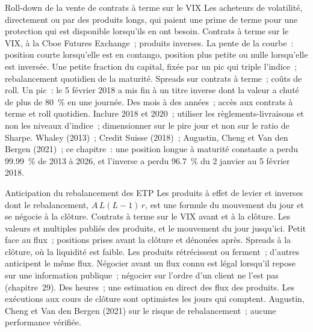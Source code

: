 \begin{strategyfile}{Roll-down de la vente de contrats à terme sur le VIX}\label{strat:s2:the-volatility-index-complex:rolldown}
 Les acheteurs de volatilité, directement ou par des produits longs, qui paient une prime de terme pour une protection qui est
disponible lorsqu'ils en ont besoin.
 Contrats à terme sur le VIX, à la Cboe Futures Exchange~; produits inverses.
 La pente de la courbe~: position courte lorsqu'elle est en contango, position plus petite ou nulle lorsqu'elle est inversée.
 Une petite fraction du capital, fixée par un pic qui triple l'indice~; rebalancement quotidien de la maturité.
 Spreads sur contrats à terme~; coûts de roll.
 Un pic~: le 5 février 2018 a mis fin à un titre inverse dont la valeur a chuté de plus de 80~\% en une journée.
 Des mois à des années~; accès aux contrats à terme et roll quotidien.
 Inclure 2018 et 2020~; utiliser les règlements-livraisons et non les niveaux d'indice~; dimensionner sur le pire jour et non sur le ratio de Sharpe.
 Whaley (2013)~; Credit Suisse (2018)~; Augustin, Cheng et Van den Bergen (2021)~; ce chapitre~: une position longue à maturité constante
a perdu 99.99~\% de 2013 à 2026, et l'inverse a perdu 96.7~\% du 2 janvier au 5 février 2018.
\end{strategyfile}

\begin{strategyfile}{Anticipation du rebalancement des ETP}\label{strat:s2:the-volatility-index-complex:flow}
 Les produits à effet de levier et inverses dont le rebalancement, $A\,L(L - 1)\,r$, est une formule du mouvement du jour et se négocie à la
clôture.
 Contrats à terme sur le VIX avant et à la clôture.
 Les valeurs et multiples publiés des produits, et le mouvement du jour jusqu'ici.
 Petit face au flux~; positions prises avant la clôture et dénouées après.
 Spreads à la clôture, où la liquidité est faible.
 Les produits rétrécissent ou ferment~; d'autres anticipent le même flux. Négocier avant un flux connu est légal lorsqu'il repose sur une
information publique~; négocier sur l'ordre d'un client ne l'est pas (chapitre~29).
 Des heures~; une estimation en direct des flux des produits.
 Les exécutions aux cours de clôture sont optimistes les jours qui comptent.
 Augustin, Cheng et Van den Bergen (2021) sur le risque de rebalancement~; aucune performance vérifiée.
\end{strategyfile}

